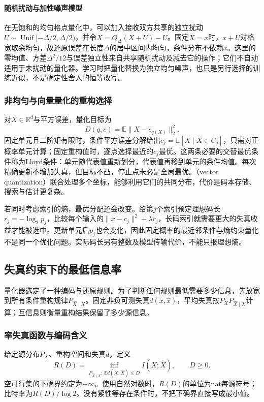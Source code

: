 \paragraph{随机扰动与加性噪声模型}
在无饱和的均匀格点量化中，可以加入接收双方共享的独立扰动\(U\sim\operatorname{Unif}[-\Delta/2,\Delta/2)\)，并令\(\widehat X=Q_\Delta(X+U)-U\)。固定\(X=x\)时，\(x+U\)对格宽取余均匀，故还原误差在长度\(\Delta\)的居中区间内均匀，条件分布不依赖\(x\)。这里的零均值、方差\(\Delta^2/12\)与误差独立性来自共享随机扰动及减去它的操作；它们不自动适用于未扰动的量化器。学习时把量化替换为独立均匀噪声，也只是另行选择的训练近似，不是确定性舍入的恒等改写。

\subsubsection{非均匀与向量量化的重构选择}
对\(X\in\mathbb R^d\)与平方误差，量化目标为
\[
 D(q,c)=\mathbb E\|X-c_{q(X)}\|_2^2.
\]
固定单元且二阶矩有限时，条件平方误差分解给出\(c_j=\mathbb E[X\mid X\in C_j]\)，只需对正概率单元计算；固定重构值时，逐点选择最近的\(c_j\)最优。这两条必要的交替最优条件称为Lloyd条件：单元随代表值重新划分，代表值再移到单元的条件均值。每次精确更新不增加失真，但目标不凸，停止点未必是全局最优。（vector quantization）联合处理多个坐标，能够利用它们的共同分布，代价是码本存储、搜索与估计更复杂。

若同时考虑索引的熵，最优分配还会改变。给第\(j\)个索引预定理想码长\(r_j=-\log_2p_j\)，比较每个输入的\(\|x-c_j\|^2+\lambda r_j\)，长码索引就需要更大的失真收益才能被选中。更新单元后\(p_j\)也会变化，因此固定概率的最近邻条件与熵约束量化不是同一个优化问题。实际码长另有整数及模型传输代价，不能只报理想熵。

\subsection{失真约束下的最低信息率}
\label{sec:information-rate-distortion}

量化器选定了一种编码与还原规则。为了判断任何规则最低需要多少信息，先放宽到所有条件重构规律\(P_{\widehat X\mid X}\)。固定非负可测失真\(d(x,\widehat x)\)，平均失真按\(P_XP_{\widehat X\mid X}\)计算；互信息则衡量重构结果保留了多少源信息。

\subsubsection{率失真函数与编码含义}
\begin{definition}[率失真函数]
\label{def:information-rate-distortion}
给定源分布\(P_X\)、重构空间和失真\(d\)，定义
\begin{equation}
 R(D)=\inf_{P_{\widehat X\mid X}:\,\mathbb E d(X,\widehat X)\leq D}
 I(X;\widehat X),\qquad D\geq0.
 \label{eq:information-rate-distortion}
\end{equation}
空可行集的下确界约定为\(+\infty\)。使用自然对数时，\(R(D)\)的单位为nat每源符号；比特率为\(R(D)/\log2\)。没有紧性等存在条件时，不把下确界直接写成最小值。
\end{definition}

